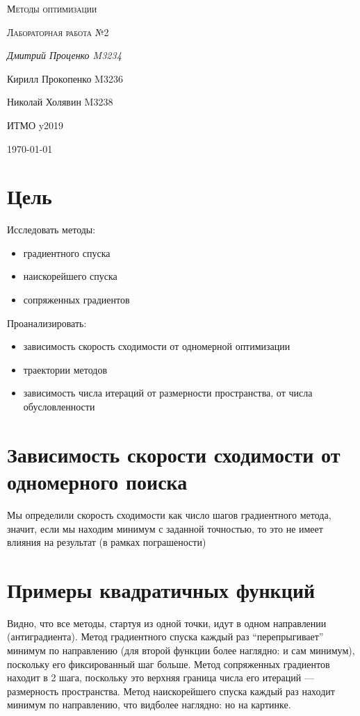 \documentclass[russian, english]{article}
\begin{document}
\begin{titlepage}
\centering
	{\scshape\LARGE Методы оптимизации \par}
	\vspace{1cm}
	{\scshape\Large Лабораторная работа №2\par}
	\vspace{2cm}
	{\Large\itshape Дмитрий Проценко M3234 \par
	Кирилл Прокопенко M3236 \par
	Николай Холявин M3238 \par}
	\vfill
	ИТМО y2019
	\vfill
	{\large \today\par}
\end{titlepage}

\tableofcontents
\newpage

\section{Цель}
Исследовать методы:
\begin{itemize}
	\item градиентного спуска
	\item наискорейшего спуска
	\item сопряженных градиентов
\end{itemize}
Проанализировать:
\begin{itemize}
	\item зависимость скорость сходимости от одномерной оптимизации
	\item траектории методов
	\item зависимость числа итераций от размерности пространства, от числа обусловленности
\end{itemize}

\section{Зависимость скорости сходимости от одномерного поиска}
Мы определили скорость сходимости как число шагов градиентного метода, значит, если мы находим минимум с заданной точностью, то это не имеет влияния на результат (в рамках пограшености)

\section{Примеры квадратичных функций}
\noindent{}
\newpage
\noindent{}
\newpage
\noindent{}
\par
Видно, что все методы, стартуя из одной точки, идут в одном направлении (антиградиента).
Метод градиентного спуска каждый раз ``перепрыгивает'' минимум по направлению (для второй функции более наглядно: и сам минимум), поскольку его фиксированный шаг больше.
Метод сопряженных градиентов находит в 2 шага, поскольку это верхняя граница числа его итераций --- размерность пространства.
Метод наискорейшего спуска каждый раз находит минимум по направлению, что видболее наглядно: но на картинке.
\end{document}

